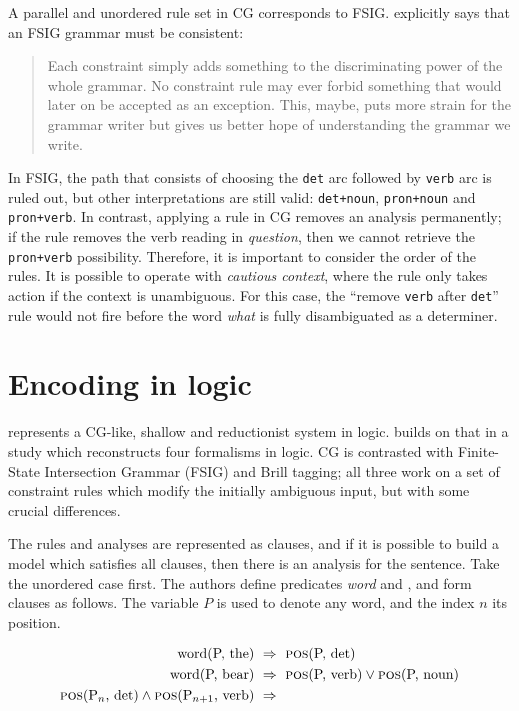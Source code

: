 A parallel and unordered rule set in CG corresponds to FSIG.
\cite{koskenniemi90} explicitly says that an FSIG grammar must be
consistent:
 
 \begin{quote}
 Each constraint simply adds something to the discriminating power of the
 whole grammar. No constraint rule may ever forbid something that would
 later on be accepted as an exception. This, maybe, puts more strain for
 the grammar writer but gives us better hope of understanding the grammar
 we write.
 \end{quote}


In FSIG, the path that consists of choosing the \texttt{det} arc
followed by \texttt{verb} arc is ruled out, but other interpretations
are still valid: \texttt{det+noun}, \texttt{pron+noun} and
\texttt{pron+verb}. In contrast, applying a rule in CG removes an
analysis permanently; if the rule removes the verb reading in
\emph{question}, then we cannot retrieve the \texttt{pron+verb}
possibility. Therefore, it is important to consider the order of the
rules. It is possible to operate with \emph{cautious context}, where the
rule only takes action if the context is unambiguous. For this case, the
``remove \texttt{verb} after \texttt{det}'' rule would not fire before
the word \emph{what} is fully disambiguated as a determiner.


\section*{Encoding in logic}\label{encoding-in-logic}

\cite{lager98} represents a CG-like, shallow and reductionist system in
logic. \cite{lager_nivre01} builds on that in a study which reconstructs
four formalisms in logic. CG is contrasted with Finite-State
Intersection Grammar (FSIG) and Brill tagging; all three work on a set
of constraint rules which modify the initially ambiguous input, but with some crucial
differences.

The rules and analyses are represented as clauses, and if it is
possible to build a model which satisfies all clauses, then there is
an analysis for the sentence.
Take the unordered case first. The authors define predicates \emph{word}
and \emph{}, and form clauses as follows. The variable $P$ is used to
denote any word, and the index $n$ its position.

\begin{align*}
\text{word(P, the)} \  &\Rightarrow \ \text{{\sc pos}(P, det)} \\
\text{word(P, bear)} \ &\Rightarrow \ \text{{\sc pos}(P, verb)} \vee \text{{\sc pos}(P, noun)} \\
\text{{\sc pos}(P$_n$, det)} \wedge \text{{\sc pos}(P$_{n+1}$, verb)} \ &\Rightarrow 
\end{align*}

